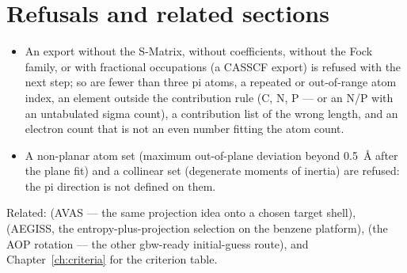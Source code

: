\section{Refusals and related sections}

\begin{refusalbox}
\begin{itemize}
  \item An export without the S-Matrix, without coefficients, without the
    Fock family, or with fractional occupations (a CASSCF export) is
    refused with the next step; so are fewer than three pi atoms, a
    repeated or out-of-range atom index, an element outside the
    contribution rule (C, N, P --- or an N/P with an untabulated sigma
    count), a contribution list of the wrong length, and an electron count
    that is not an even number fitting the atom count.
  \item A non-planar atom set (maximum out-of-plane deviation beyond
    0.5~\AA{} after the plane fit) and a collinear set (degenerate moments
    of inertia) are refused: the pi direction is not defined on them.
\end{itemize}
\end{refusalbox}

Related:  (AVAS --- the same projection idea onto a chosen target
shell),  (AEGISS, the entropy-plus-projection selection on the
benzene platform),  (the AOP rotation --- the other gbw-ready
initial-guess route), and Chapter~\ref{ch:criteria} for the criterion
table.
